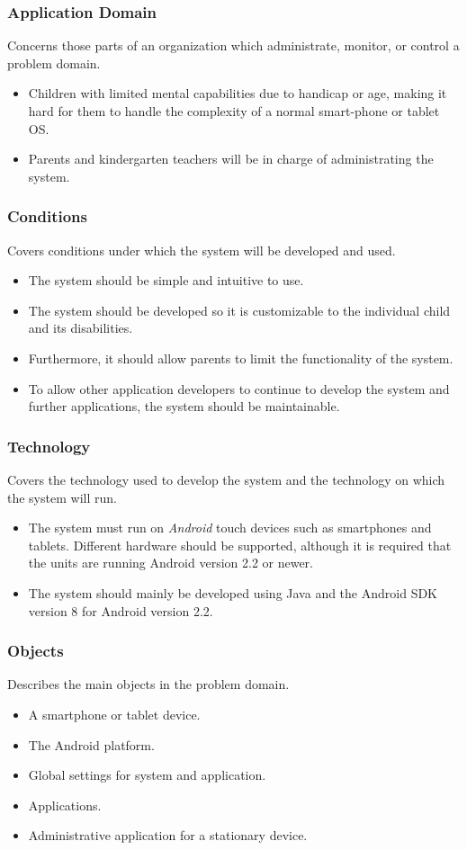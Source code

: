 \subsubsection{Application Domain} 
Concerns those parts of an organization which administrate, monitor, or control a
problem domain.
\begin{itemize}
	\item Children with limited mental capabilities due to handicap or age, making it hard for them to handle the complexity of a normal smart-phone or tablet OS. 
	\item Parents and kindergarten teachers will be in charge of administrating the system.
\end{itemize}

\subsubsection{Conditions} 
Covers conditions under which the system will be developed and used.
\begin{itemize}
	\item The system should be simple and intuitive to use. 
	\item The system should be developed so it is customizable to the individual child and its disabilities.
	\item Furthermore, it should allow parents to limit the functionality of the system. 
	\item To allow other application developers to continue to develop the system and further applications, the system should be maintainable.
\end{itemize}

\subsubsection{Technology} 
Covers the technology used to develop the system and the technology on which the system will run.
\begin{itemize}
	\item The system must run on \emph{Android} touch devices such as smartphones and tablets. Different hardware should be supported, although it is required that the units are running Android version 2.2 or newer. 
	\item The system should mainly be developed using Java and the Android SDK version 8 for Android version 2.2.
\end{itemize}

\subsubsection{Objects} 
Describes the main objects in the problem domain.
\begin{itemize}
	\item A smartphone or tablet device. 
	\item The Android platform. 
	\item Global settings for system and application.
	\item Applications.
	\item Administrative application for a stationary device.
\end{itemize}

